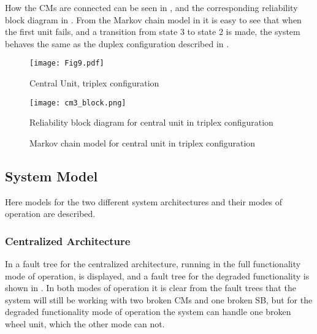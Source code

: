 How the CMs are connected can be seen in , and the corresponding reliability block diagram in . From the Markov chain model in  it is easy to see that when the first unit fails, and a transition from state 3 to state 2 is made, the system behaves the same as the duplex configuration described in . 

\begin{figure}[H]
  \centering
  \texttt{[image: Fig9.pdf]}
  \caption{Central Unit, triplex configuration }
  \label{fig9}
\end{figure}

\begin{figure}[H]
  \centering
  \texttt{[image: cm3\_block.png]}
  \caption{Reliability block diagram for central unit in triplex configuration}
  \label{fig10}
\end{figure}
\begin{figure}[H]
  \centering
  \caption{Markov chain model for central unit in triplex configuration}
  \label{fig11}
\end{figure}





\subsection{System Model}
Here models for the two different system architectures and their modes of operation are described.

\subsubsection{Centralized Architecture}
\label{subsubsec:smca}
In  a fault tree for the centralized architecture, running in the full functionality mode of operation, is displayed, and a fault tree for the degraded functionality is shown in . In both modes of operation it is clear from the fault trees that the system will still be working with two broken CMs and one broken SB, but for the degraded functionality mode of operation the system can handle one broken wheel unit, which the other mode can not.    

